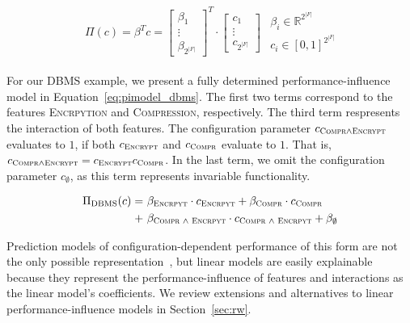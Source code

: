 \documentclass[sigconf]{acmart}
\begin{document}
	\begin{align} \label{eq:pimodel}
		\begin{split}
			\Pi(c) = \beta^T c =  \begin{bmatrix}
				\beta_1\\
				\vdots \\
				\beta_{2^{\vert F\vert}}
			\end{bmatrix}^T \cdot \begin{bmatrix}
			c_1\\
			\vdots \\
			c_{2^{\vert F\vert}}
		\end{bmatrix}
		\end{split}
		\begin{split}
			\beta_i \in \mathbb{R}^{2^{|F|}}\\
			c_i \in \left[0,1\right]^{2^{|F|}}
		\end{split}
	\end{align}

	For our DBMS example, we present a fully determined performance-influence model in Equation~\ref{eq:pimodel_dbms}. The first two terms correspond to the features \textsc{Encrpytion} and \textsc{Compression}, respectively. The third term respresents the interaction of both features. The configuration parameter $c_{\textsc{Compr}\land\textsc{Encrypt}}$ evaluates to $1$, if both $c_{\textsc{Encrypt}}$ and $c_{\textsc{Compr}}$ evaluate to $1$.
	That is, $c_{\textsc{Compr}\land\textsc{Encrypt}} = c_{\textsc{Encrypt}}c_{\textsc{Compr}}$. In the last term, we omit the configuration parameter $c_\emptyset$, as this term represents invariable functionality.

	\begin{align} \label{eq:pimodel_dbms}
		\begin{split}
		\Pi_{\text{DBMS}}(c) =&~\beta_{\textsc{Encrpyt}} \cdot c_{\textsc{Encrpyt}} + \beta_{\textsc{Compr}} \cdot c_{\textsc{Compr}} \\
		+&~ \beta_{\textsc{Compr\ $\land$\ Encrpyt}} \cdot c_{\textsc{Compr\ $\land$\ Encrpyt}}
		+ \beta_{\emptyset}
	\end{split}
	\end{align}

	Prediction models of configuration-dependent performance of this form are not the only possible representation~\cite{guoVariabilityawarePerformancePrediction2013,haDeepPerf2019}, but linear models are easily explainable because they represent the performance-influence of features and interactions as the linear model's coefficients.
	We review extensions and alternatives to linear performance-influence models in Section~\ref{sec:rw}.
\end{document}
